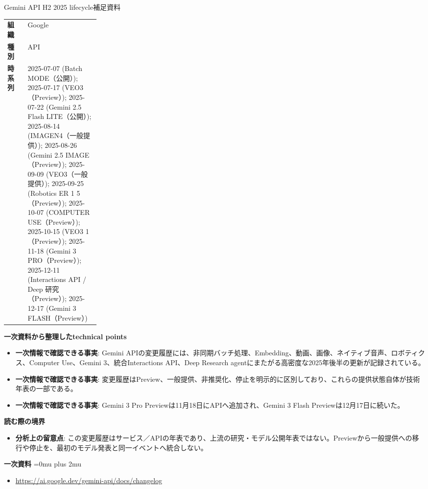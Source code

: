\begin{technicalnote}{Gemini API H2 2025 lifecycle}{補足資料}
\begingroup
\begin{tabularx}{\linewidth}{@{}>{\bfseries}p{0.22\linewidth}X@{}}
組織 & Google \\
種別 & API \\
時系列 & 2025-07-07 (Batch MODE（公開）); 2025-07-17 (VEO3（Preview）); 2025-07-22 (Gemini 2.5 Flash LITE（公開）); 2025-08-14 (IMAGEN4（一般提供）); 2025-08-26 (Gemini 2.5 IMAGE（Preview）); 2025-09-09 (VEO3（一般提供）); 2025-09-25 (Robotics ER 1 5（Preview）); 2025-10-07 (COMPUTER USE（Preview）); 2025-10-15 (VEO3 1（Preview）); 2025-11-18 (Gemini 3 PRO（Preview）); 2025-12-11 (Interactions API / Deep 研究（Preview）); 2025-12-17 (Gemini 3 FLASH（Preview）) \\
\end{tabularx}
\smallskip
{\bfseries 一次資料から整理したtechnical points}
\begin{itemize}[leftmargin=1.5em,itemsep=0.35em]
\item \textbf{一次情報で確認できる事実}: Gemini APIの変更履歴には、非同期バッチ処理、Embedding、動画、画像、ネイティブ音声、ロボティクス、Computer Use、Gemini 3、統合Interactions API、Deep Research agentにまたがる高密度な2025年後半の更新が記録されている。
\item \textbf{一次情報で確認できる事実}: 変更履歴はPreview、一般提供、非推奨化、停止を明示的に区別しており、これらの提供状態自体が技術年表の一部である。
\item \textbf{一次情報で確認できる事実}: Gemini 3 Pro Previewは11月18日にAPIへ追加され、Gemini 3 Flash Previewは12月17日に続いた。
\end{itemize}
\begin{minipage}{\linewidth}
{\bfseries 読む際の境界}
\begin{itemize}[leftmargin=1.5em,itemsep=0.35em]
\item \textbf{分析上の留意点}: この変更履歴はサービス／APIの年表であり、上流の研究・モデル公開年表ではない。Previewから一般提供への移行や停止を、最初のモデル発表と同一イベントへ統合しない。
\end{itemize}
\begin{samepage}
{\bfseries 一次資料}
\begingroup\sloppy
\Urlmuskip=0mu plus 2mu\relax
\begin{itemize}[leftmargin=1.5em,itemsep=0.25em]
\item {\scriptsize\url{https://ai.google.dev/gemini-api/docs/changelog}}
\end{itemize}
\endgroup
\end{samepage}
\end{minipage}
\endgroup
\end{technicalnote}
\medskip

